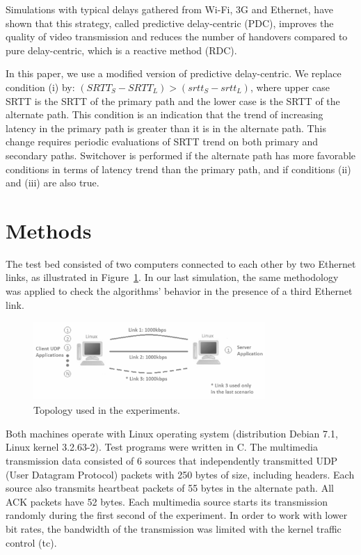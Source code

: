 \documentclass{sbrt2015}
\begin{document}
Simulations with typical delays gathered from Wi-Fi, 3G and Ethernet, have shown that this strategy, called predictive delay-centric (PDC), improves the quality of video transmission and reduces the number of handovers compared to pure delay-centric, which is a reactive method (RDC).

In this paper, we use a modified version of predictive delay-centric. We replace condition (i) by:
${(SRTT_S - SRTT_L) > (srtt_S - srtt_L)}$, where upper case SRTT is the SRTT of the primary path and the lower case is the SRTT of the alternate path. This condition is an indication that the trend of increasing latency in the primary path is greater than it is in the alternate path. This change requires periodic evaluations of SRTT trend on both primary and secondary paths. Switchover is performed if the alternate path has more favorable conditions in terms of latency trend than the primary path, and if conditions (ii) and (iii) are also true. 

\section{Methods}

The test bed consisted of two computers connected to each other by two Ethernet links, as illustrated in Figure~\ref{topology}. In our last simulation, the same methodology was applied to check the algorithms' behavior in the presence of a third Ethernet link.

\begin{figure}[ht!]
\centering
\includegraphics[width=8.8cm,height=3cm]{figura1}
\caption{Topology used in the experiments.}
\label{topology}
\end{figure}

Both machines operate with Linux operating system (distribution Debian 7.1, Linux kernel 3.2.63-2). Test programs were written in C. The multimedia transmission data consisted of 6 sources that independently transmitted UDP (User Datagram Protocol) packets with 250 bytes of size, including headers. Each source also transmits heartbeat packets of 55 bytes in the alternate path. All ACK packets have 52 bytes. Each multimedia source starts its transmission randomly during the first second of the experiment. In order to work with lower bit rates, the bandwidth of the transmission was limited with the kernel traffic control (tc). 
\end{document}
